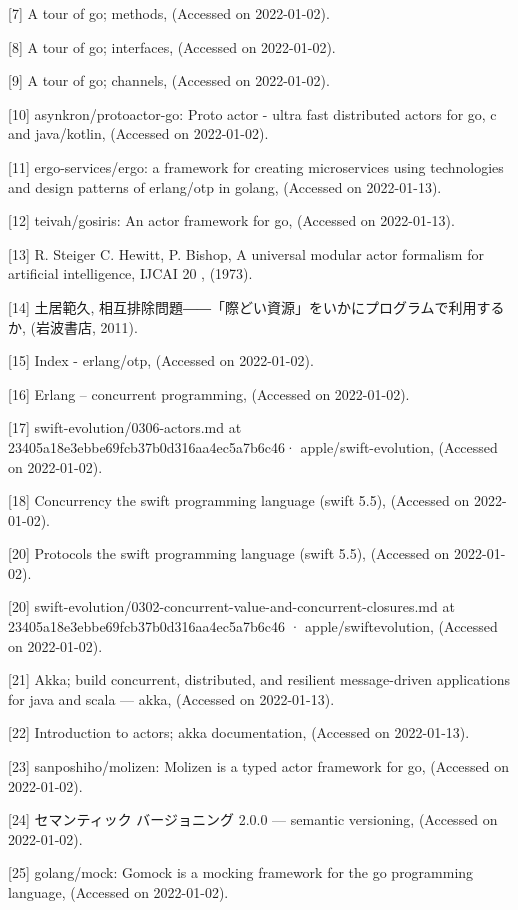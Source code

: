 {[}7{]} A tour of go; methods, 
(Accessed on 2022-01-02).

{[}8{]} A tour of go; interfaces, 
(Accessed on 2022-01-02).

{[}9{]} A tour of go; channels,
(Accessed on 2022-01-02).

{[}10{]} asynkron/protoactor-go: Proto actor - ultra fast distributed
actors for go, c and java/kotlin,
(Accessed on 2022-01-02).

{[}11{]} ergo-services/ergo: a framework for creating microservices
using technologies and design patterns of erlang/otp in golang,
(Accessed on 2022-01-13).

{[}12{]} teivah/gosiris: An actor framework for go,
(Accessed on 2022-01-13).

{[}13{]} R. Steiger C. Hewitt, P. Bishop, A universal modular actor
formalism for artificial intelligence, IJCAI 20 , (1973).

{[}14{]} 土居範久,
相互排除問題――「際どい資源」をいかにプログラムで利用するか, (岩波書店,
2011).

{[}15{]} Index - erlang/otp, 
(Accessed
on 2022-01-02).

{[}16{]} Erlang -- concurrent programming,
(Accessed on 2022-01-02).

{[}17{]} swift-evolution/0306-actors.md at
23405a18e3ebbe69fcb37b0d316aa4ec5a7b6c46· apple/swift-evolution,
(Accessed on 2022-01-02).

{[}18{]} Concurrency the swift programming language (swift 5.5),
(Accessed on 2022-01-02).

{[}20{]} Protocols the swift programming language (swift 5.5),
(Accessed on 2022-01-02).

{[}20{]}
swift-evolution/0302-concurrent-value-and-concurrent-closures.md at
23405a18e3ebbe69fcb37b0d316aa4ec5a7b6c46 · apple/swiftevolution,
(Accessed on 2022-01-02).

{[}21{]} Akka; build concurrent, distributed, and resilient
message-driven applications for java and scala --- akka,
(Accessed on 2022-01-13).

{[}22{]} Introduction to actors; akka documentation,
(Accessed on 2022-01-13).

{[}23{]} sanposhiho/molizen: Molizen is a typed actor framework for go,
(Accessed on 2022-01-02).

{[}24{]} セマンティック バージョニング 2.0.0 --- semantic versioning,
(Accessed on 2022-01-02).

{[}25{]} golang/mock: Gomock is a mocking framework for the go
programming language, (Accessed on 2022-01-02).

